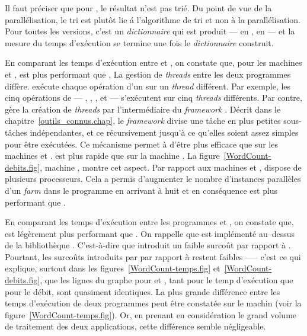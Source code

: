 Il faut pr\'eciser que pour , le r\'esultat n'est pas tri\'e. Du point de vue de la parall\'elisation, le tri est plut\^ot lie \'a l'algorithme de tri et non \`a la parall\'elisation. Pour toutes les versions, c'est un \emph{dictionnaire} qui est produit ---  en ,  en  --- et la mesure du temps d'exécution se termine une fois le \emph{dictionnaire} construit.

En comparant les temps d'ex\'ecution entre  et , on constate que, pour les machines  et ,  est plus performant que . La gestion de \emph{threads} entre les deux programmes diff\`ere.  ex\'ecute chaque op\'eration d'un  sur un \emph{thread} diff\'erent. Par exemple, les cinq op\'erations de  --- , , ,  et  --- s'ex\'ecutent sur cinq \emph{threads} diff\'erents. Par contre,  g\`ere la cr\'eation de \emph{threads} par l'interm\'ediaire du \emph{framework} . D\'ecrit dans le chapitre~\ref{outils_connus.chap}, le \emph{framework} divise une t\^ache en plus petites sous-t\^aches ind\'ependantes, et ce r\'ecursivement jusqu'\`a ce qu'elles soient assez simples pour \^etre ex\'ecut\'ees. Ce m\'ecanisme permet \`a  d'\^etre plus efficace que  sur les machines  et .  est plus rapide que  sur la machine . La figure~\ref{WordCount-debits.fig}, machine , montre cet aspect. Par rapport aux machines  et ,  dispose de plusieurs processeurs. Cela a permis d'augmenter le nombre d'instances parall\`eles d'un \emph{farm} dans le programme  en arrivant \`a huit et en cons\'equence  est plus performant que . 


En comparant les temps d'ex\'ecution entre les programmes  et , on constate que,  est l\'eg\`erement plus performant que . On rappelle que  est impl\'ement\'e au–dessus de la biblioth\`eque . C'est-\`a-dire que  introduit un faible surco\^ut par rapport \`a . Pourtant, les surco\^uts introduits par  par rapport \`a  restent faibles --— c'est ce qui explique, surtout dans les figures~\ref{WordCount-temps.fig} et~\ref{WordCount-debits.fig}, que les lignes du graphe pour  et , tant pour le temp d'ex\'ecution que pour le d\'ebit, sont quasiment identiques. La plus grande diff\'erence entre les temps d'ex\'ecution de deux programmes peut \^etre constat\'ee sur le machin  (voir la figure~\ref{WordCount-temps.fig}). Or, en prenant en consid\'eration le grand volume de traitement des deux applications, cette diff\'erence semble n\'egligeable.

